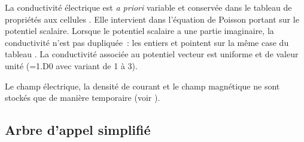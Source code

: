 \bigskip
La conductivit\'e \'electrique est {\it a priori} variable et
conserv\'ee dans le tableau de propri\'et\'es aux cellules
. Elle intervient dans l'\'equation de
Poisson portant sur le potentiel scalaire. Lorsque le potentiel scalaire a une
partie imaginaire, la conductivit\'e n'est pas dupliqu\'ee~:
les entiers  et  pointent sur la
m\^eme case du tableau . La conductivit\'e associ\'ee au potentiel
vecteur est uniforme et de valeur unit\'e (=1.D0
avec  variant de 1 \`a 3).

Le champ \'electrique, la densit\'e de courant et le champ magn\'etique ne sont
stock\'es que de mani\`ere temporaire (voir ).


\newpage

\subsection*{Arbre d'appel simplifi\'e}

